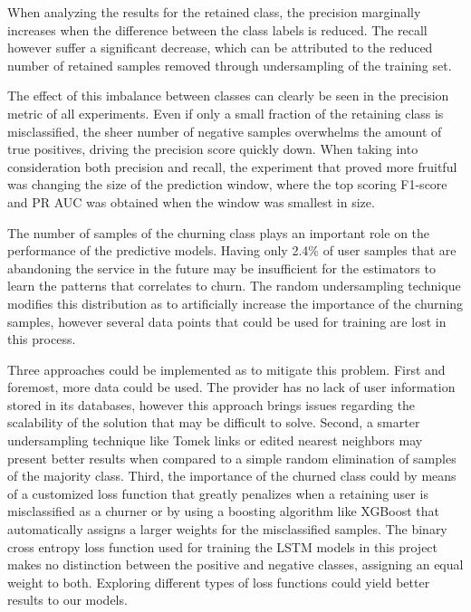 \documentclass{kththesis}
\begin{document}
When analyzing the results for the retained class, the precision marginally increases when the difference between the class labels is reduced. The recall however suffer a significant decrease, which can be attributed to the reduced number of retained samples removed through undersampling of the training set.

The effect of this imbalance between classes can clearly be seen in the precision metric of all experiments. Even if only a small fraction of the retaining class is misclassified, the sheer number of negative samples overwhelms the amount of true positives, driving the precision score quickly down. When taking into consideration both precision and recall, the experiment that proved more fruitful was changing the size of the prediction window, where the top scoring F1-score and PR AUC was obtained when the window was smallest in size. 

The number of samples of the churning class plays an important role on the performance of the predictive models. Having only 2.4\% of user samples that are abandoning the service in the future may be insufficient for the estimators to learn the patterns that correlates to churn. The random undersampling technique modifies this distribution as to artificially increase the importance of the churning samples, however several data points that could be used for training are lost in this process. 

Three approaches could be implemented as to mitigate this problem. First and foremost, more data could be used. The provider has no lack of user information stored in its databases, however this approach brings issues regarding the scalability of the solution that may be difficult to solve. Second, a smarter undersampling technique like Tomek links \citep{tomek1976two} or edited nearest neighbors \citep{smith2014instance} may present better results when compared to a simple random elimination of samples of the majority class. Third, the importance of the churned class could by means of a customized loss function that greatly penalizes when a retaining user is misclassified as a churner or by using a boosting algorithm like XGBoost \citep{chen2016xgboost} that automatically assigns a larger weights for the misclassified samples. The binary cross entropy loss function used for training the LSTM models in this project makes no distinction between the positive and negative classes, assigning an equal weight to both. Exploring different types of loss functions could yield better results to our models.
\end{document}
